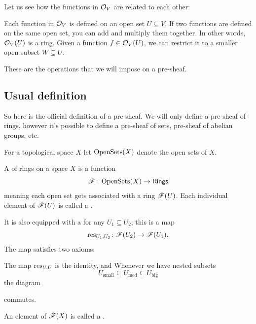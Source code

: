 Let us see how the functions in $\mathcal O_V$ are related to each other:
\begin{itemize}
	\ii Each function in $\mathcal O_V$ is defined on an open set $U \subseteq V$.
	\ii If two functions are defined on the same open set, you can add and
	multiply them together. In other words, $\mathcal O_V(U)$ is a ring.
	\ii Given a function $f \in \mathcal O_V(U)$, we can restrict it to a smaller open
	subset $W \subseteq U$.
\end{itemize}
These are the operations that we will impose on a pre-sheaf.

\subsection{Usual definition}
So here is the official definition of a pre-sheaf.
We will only define a pre-sheaf of rings, however it's possible to define a
pre-sheaf of sets, pre-sheaf of abelian groups, etc.
\begin{definition}
	For a topological space $X$ let $\operatorname{OpenSets}(X)$ denote the open sets of $X$.
\end{definition}
\begin{definition}
	\label{def:pre_sheaf}
	A  of rings on a space $X$ is a function
	\[ \mathscr F \colon \operatorname{OpenSets}(X) \to \mathsf{Rings} \]
	meaning each open set gets associated with a ring $\mathscr F(U)$.
	Each individual element of $\mathscr F(U)$ is called a .

	It is also equipped with a 
	for any $U_1 \subseteq U_2$; this is a map
	\[ \operatorname{res}_{U_1, U_2}
		\colon \mathscr F(U_2) \to \mathscr F(U_1). \]
	The map satisfies two axioms:
	\begin{itemize}
		\ii The map $\operatorname{res}_{U,U}$ is the identity, and
		\ii Whenever we have nested subsets
		\[ U_{\text{small}} \subseteq U_{\text{med}} \subseteq U_{\text{big}} \]
		the diagram
		\begin{center}
		\end{center}
		commutes.
	\end{itemize}
\end{definition}

\begin{definition}
	An element of $\mathscr F(X)$ is called a .
\end{definition}

